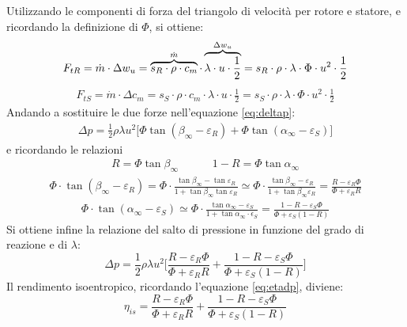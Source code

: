 Utilizzando le componenti di forza del triangolo di velocità per rotore e statore, e ricordando la definizione di $\Phi$, si ottiene:
\begin{align*}
F_{tR} = \dot{m} \cdot \Delta w_u = \overbrace{s_R \cdot \rho \cdot c_m}^\text{$ \dot{m} $} \cdot \overbrace{\lambda \cdot u \cdot \frac{1}{2}}^\text{$\Delta w_u$}=  s_R \cdot \rho \cdot \lambda \cdot \Phi \cdot u^2 \cdot \frac{1}{2}
\end{align*}
\begin{align*}
F_{tS} = \dot{m} \cdot \Delta c_m = s_S \cdot \rho \cdot c_m \cdot \lambda \cdot u \cdot \frac{1}{2} =s_S \cdot \rho \cdot \lambda \cdot \Phi \cdot u^2 \cdot \frac{1}{2}
\end{align*}
Andando a sostituire le due forze nell'equazione \ref{eq:deltap}:
\begin{align*}
\Delta p = \frac{1}{2} \rho \lambda u^2 \big[\Phi \tan \left( \beta_{\infty} - \varepsilon_R \right) + \Phi \tan \left( \alpha_{\infty} - \varepsilon_S \right) \big]
\end{align*}
e ricordando le relazioni
\begin{align*}
R = \Phi \tan \beta_{\infty} \;\;\;\;\;\;\;\;\;\;\; 1 - R = \Phi \tan \alpha_{\infty} 
\end{align*}
\begin{align*}
\Phi \cdot \tan ( \beta_{\infty} - \varepsilon_R ) = \Phi \cdot \frac{\tan \beta_{\infty} - \tan \varepsilon_R}{1 + \tan \beta_{\infty} \tan \varepsilon_R} \simeq \Phi \cdot \frac{\tan \beta_{\infty} - \varepsilon_R}{1 + \tan \beta_{\infty} \varepsilon_R}= \frac{R - \varepsilon_R \Phi}{\Phi + \varepsilon_R R}
\end{align*}
\begin{align*}
\Phi \cdot \tan (\alpha_{\infty} - \varepsilon_S) \simeq \Phi \cdot \frac{\tan \alpha_{\infty} - \varepsilon_S}{1 + \tan \alpha_{\infty} \cdot \epsilon_S} = \frac{1 - R - \varepsilon_S \Phi}{\Phi + \varepsilon_S (1-R)}
\end{align*}
Si ottiene infine la relazione del salto di pressione in funzione del grado di reazione e di $\lambda$:
\begin{equation}
\Delta p = \frac{1}{2} \rho \lambda u^2 \Bigg[ \frac{R - \varepsilon_R \Phi}{\Phi + \varepsilon_R R} + \frac{1 - R - \varepsilon_S \Phi}{\Phi + \varepsilon_S (1-R)} \Bigg]
\end{equation}
Il rendimento isoentropico, ricordando l'equazione \ref{eq:etadp}, diviene:
\begin{equation}
\boxed{ \eta_{is} = \frac{R - \varepsilon_R \Phi}{\Phi + \varepsilon_R R} + \frac{1 - R - \varepsilon_S \Phi}{\Phi + \varepsilon_S (1-R)} }
\end{equation}

